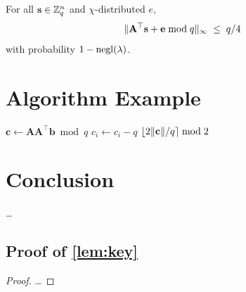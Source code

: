 \documentclass[11pt, a4paper]{article}
\begin{document}
\begin{lemma}
  \label{lem:key}
  For all $\mathbf{s} \in \mathbb{Z}_q^n$ and $\chi$-distributed $e$,
  \[
    \lVert\mathbf{A}^\top\mathbf{s} + \mathbf{e} \bmod q\rVert_\infty
    \;\le\; q/4
  \]
  with probability $1 - \mathrm{negl}(\lambda)$.
\end{lemma}

\section{Algorithm Example}
\label{sec:alg}

\begin{algorithm}[H]
  \caption{Example algorithm}
  \label{alg:example}
  \begin{algorithmic}[1]
    \State $\mathbf{c} \gets \mathbf{A}\mathbf{A}^\top\mathbf{b} \bmod q$
        \State $c_i \gets c_i - q$
      \EndIf
    \EndFor
    \State \Return $\lfloor 2\lVert\mathbf{c}\rVert / q \rceil \bmod 2$
  \end{algorithmic}
\end{algorithm}

\section{Conclusion}
\label{sec:conclusion}

\ldots


% 
% 

\begin{appendices}

\section{Proof of \texorpdfstring{\cref{lem:key}}{Lemma~\ref{lem:key}}}
\label{app:proof-lem-key}

\begin{proof}
  \ldots
\end{proof}

\end{appendices}
\end{document}
